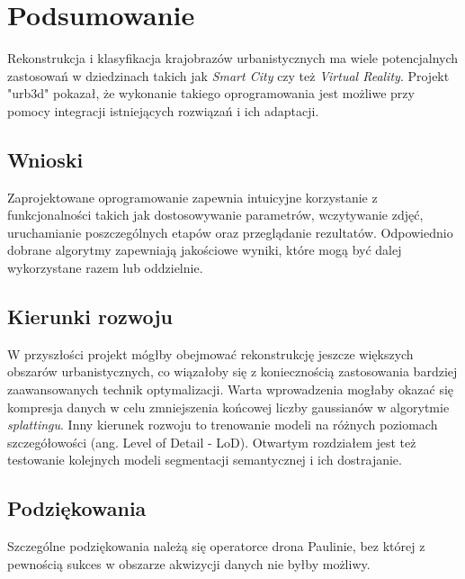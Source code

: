 \section{Podsumowanie}
Rekonstrukcja i klasyfikacja krajobrazów urbanistycznych ma wiele potencjalnych zastosowań w dziedzinach takich jak \textit{Smart City} czy też \textit{Virtual Reality}. Projekt "urb3d" pokazał, że wykonanie takiego oprogramowania jest możliwe przy pomocy integracji istniejących rozwiązań i ich adaptacji. 

\subsection{Wnioski}
Zaprojektowane oprogramowanie zapewnia intuicyjne korzystanie z funkcjonalności takich jak dostosowywanie parametrów, wczytywanie zdjęć, uruchamianie poszczególnych etapów oraz przeglądanie rezultatów. Odpowiednio dobrane algorytmy zapewniają jakościowe wyniki, które mogą być dalej wykorzystane razem lub oddzielnie. 

\subsection{Kierunki rozwoju}
W przyszłości projekt mógłby obejmować rekonstrukcję jeszcze większych obszarów urbanistycznych, co wiązałoby się z koniecznością zastosowania bardziej zaawansowanych technik optymalizacji. Warta wprowadzenia mogłaby okazać się kompresja danych w celu zmniejszenia końcowej liczby gaussianów w algorytmie \textit{splattingu}. Inny kierunek rozwoju to trenowanie modeli na różnych poziomach szczegółowości (ang. Level of Detail - LoD). Otwartym rozdziałem jest też testowanie kolejnych modeli segmentacji semantycznej i ich dostrajanie.

\subsection{Podziękowania}
Szczególne podziękowania należą się operatorce drona Paulinie, bez której z pewnością sukces w obszarze akwizycji danych nie byłby możliwy.